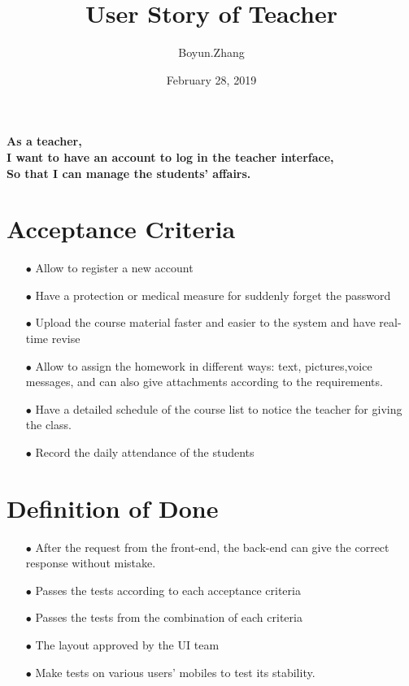 \documentclass{article}
\begin{document}
\title{User Story of Teacher}
\author{Boyun.Zhang}
\date{February 28, 2019}
\maketitle
\paragraph{\large As a teacher, \\
I want to have an account to log in the teacher interface,\\
So that I can manage the students' affairs.}

\section*{Acceptance Criteria}
\begin{itemize}
\item[$\bullet$] Allow to register a new account
\item[$\bullet$] Have a protection or medical measure for suddenly forget the password
\item[$\bullet$] Upload the course material faster and easier to the system and have real-time revise 
\item[$\bullet$] Allow to assign the homework in different ways: text, pictures,voice messages, and can also give attachments according to the requirements.
\item[$\bullet$] Have a detailed schedule of the course list to notice the teacher for giving the class.
\item[$\bullet$] Record the daily attendance of the students
\end{itemize}

\section*{Definition of Done}
\begin{itemize}
\item[$\bullet$] After the request from the front-end, the back-end can give the correct response without mistake.
\item[$\bullet$] Passes the tests according to each acceptance criteria
\item[$\bullet$] Passes the tests from the combination of each criteria
\item[$\bullet$] The layout approved by the UI team
\item[$\bullet$] Make tests on various users' mobiles to test its stability.
\end{itemize}
\end{document}
